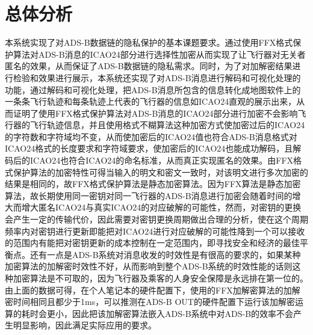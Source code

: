 \section{总体分析}
本系统实现了对ADS-B数据链的隐私保护的基本课题要求。通过使用FFX格式保护算法对ADS-B消息的ICAO24部分进行选择性加密从而实现了让飞行器对无关者匿名的效果，从而保证了ADS-B数据链的隐私需求。同时，为了对加解密结果进行检验和效果进行展示，本系统还实现了对ADS-B消息进行解码和可视化处理的功能，通过解码和可视化处理，把ADS-B消息所包含的信息转化成地图软件上的一条条飞行轨迹和每条轨迹上代表的飞行器的信息如ICAO24直观的展示出来，从而证明了使用FFX格式保护算法对ADS-B消息的ICAO24部分进行加密不会影响飞行器的飞行轨迹信息，并且使用格式不糊算法这种加密方式使加密过后的ICAO24的字符数和字符域均不变，从而使加密后的ICAO24值也符合ADS-B消息格式对ICAO24格式的长度要求和字符域要求，使加密后的ICAO24也能成功解码，且解码后的ICAO24也符合ICAO24的命名标准，从而真正实现匿名的效果。由FFX格式保护算法的加密特性可得当输入的明文和密文一致时，对该明文进行多次加密的结果是相同的，故FFX格式保护算法是静态加密算法。因为FFX算法是静态加密算法，故长期使用同一密钥对同一飞行器的ADS-B消息进行加密会随着时间的增大而增大匿名ICAO24与真实ICAO24的对应破解的可能性，然而，对密钥的更换会产生一定的传输代价，因此需要对密钥更换周期做出合理的分析，使在这个周期频率内对密钥进行更新即能把对ICAO24进行对应破解的可能性降到一个可以接收的范围内有能把对密钥更新的成本控制在一定范围内，即寻找安全和经济的最佳平衡点。还有一点是ADS-B系统对消息收发的时效性是有很高的要求的，如果某种加密算法的加解密时效性不好，从而影响到整个ADS-B系统的时效性能的话则这种加密算法是不可取的，因为飞行器及乘客的人身安全保障是永远排在第一位的。由上面的数据可得，在个人笔记本的硬件配置下，使用的FFX加解密算法的加解密时间相同且都少于1ms，可以推测在ADS-B OUT的硬件配置下运行该加解密运算的耗时会更小，因此把该加解密算法嵌入ADS-B系统中对ADS-B的效率不会产生明显影响，因此满足实际应用的要求。




















